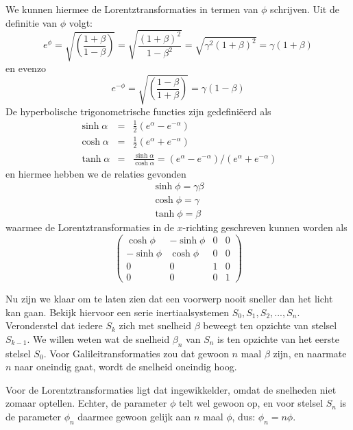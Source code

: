 We kunnen hiermee de Lorentztransformaties in termen van $\phi$ schrijven. Uit de definitie van $\phi$ volgt:
\begin{equation}
e^{\phi} = \sqrt{\left(\frac{1+\beta}{1-\beta}\right)}=\sqrt{\frac{(1+\beta)^2}{1-\beta^2}}=\sqrt{\gamma^2(1+\beta)^2}=\gamma(1+\beta)
\end{equation} 
en evenzo
\begin{equation}
e^{-\phi} = \sqrt{\left(\frac{1-\beta}{1+\beta}\right)}=\gamma(1-\beta)
\end{equation} 
De hyperbolische trigonometrische functies zijn gedefini\"eerd als
\begin{eqnarray}
\sinh \alpha & = & \frac{1}{2}\left( e^{\alpha}-e^{-\alpha}\right) \\
\cosh \alpha & = & \frac{1}{2}\left( e^{\alpha}+e^{-\alpha}\right) \\
\tanh \alpha & = & \frac{\sinh\alpha}{\cosh\alpha} = 
\left(e^{\alpha}-e^{-\alpha}\right)/ \left(e^{\alpha}+e^{-\alpha}\right)
\end{eqnarray}
en hiermee hebben we de relaties gevonden
\begin{eqnarray}
\sinh \phi = \gamma \beta \\
\cosh \phi = \gamma \\
\tanh \phi = \beta \label{e:phib}
\end{eqnarray}
waarmee de Lorentztransformaties in de $x$-richting geschreven kunnen worden als
\begin{equation}
\left( \begin{array}{cccc} \cosh \phi & -\sinh\phi & 0 & 0 \\
-\sinh \phi & \cosh\phi & 0 & 0 \\
0 & 0 & 1 & 0 \\
0 & 0 & 0 & 1 \end{array}
\right)
\end{equation}

Nu zijn we klaar om te laten zien dat een voorwerp nooit sneller dan
het licht kan gaan. Bekijk hiervoor een serie inertiaalsystemen $S_0,
S_1, S_2, ... , S_n$. Veronderstel dat iedere $S_k$ zich met snelheid
$\beta$ beweegt ten opzichte van stelsel $S_{k-1}$. We willen weten
wat de snelheid $\beta_n$ van $S_n$ is ten opzichte van het eerste
stelsel $S_0$. Voor Galileitransformaties zou dat gewoon $n$ maal
$\beta$ zijn, en naarmate $n$ naar oneindig gaat, wordt de snelheid
oneindig hoog.

Voor de Lorentztransformaties ligt dat ingewikkelder, omdat de
snelheden niet zomaar optellen. Echter, de parameter $\phi$ telt wel
gewoon op, en voor stelsel $S_n$ is de parameter $\phi_n$ daarmee gewoon
gelijk aan $n$ maal $\phi$, dus: $\phi_n=n\phi$.

